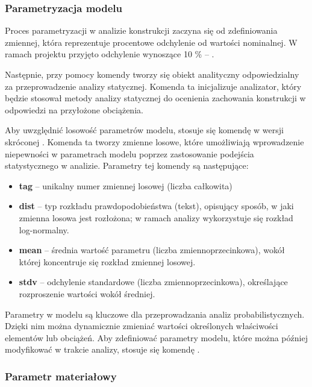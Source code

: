 \subsubsection{Parametryzacja modelu}

Proces parametryzacji w analizie konstrukcji zaczyna się od zdefiniowania zmiennej, która reprezentuje procentowe odchylenie
od wartości nominalnej. W ramach projektu przyjęto odchylenie wynoszące 10 \% – .

Następnie, przy pomocy komendy  tworzy się obiekt analityczny odpowiedzialny za przeprowadzenie
analizy statycznej. Komenda ta inicjalizuje analizator, który będzie stosował metody analizy statycznej do ocenienia zachowania konstrukcji w odpowiedzi na przyłożone obciążenia.

Aby uwzględnić losowość parametrów modelu, stosuje się komendę w wersji skróconej . Komenda ta tworzy zmienne losowe, które umożliwiają wprowadzenie niepewności w parametrach modelu
poprzez zastosowanie podejścia statystycznego w analizie. Parametry tej komendy są następujące:

\begin{itemize}
    \item \textbf{tag} – unikalny numer zmiennej losowej (liczba całkowita)
    \item \textbf{dist} – typ rozkładu prawdopodobieństwa (tekst), opisujący sposób, w jaki zmienna losowa jest rozłożona; w ramach analizy wykorzystuje się rozkład log-normalny.
    \item \textbf{mean} – średnia wartość parametru (liczba zmiennoprzecinkowa), wokół której koncentruje się rozkład zmiennej losowej.
    \item \textbf{stdv} – odchylenie standardowe (liczba zmiennoprzecinkowa), określające rozproszenie wartości wokół średniej.
\end{itemize}

Parametry w modelu są kluczowe dla przeprowadzania analiz probabilistycznych. Dzięki nim można dynamicznie zmieniać wartości określonych właściwości elementów lub obciążeń.
Aby zdefiniować parametry modelu, które można później modyfikować w trakcie analizy, stosuje się komendę .

\subsubsection*{Parametr materiałowy}

